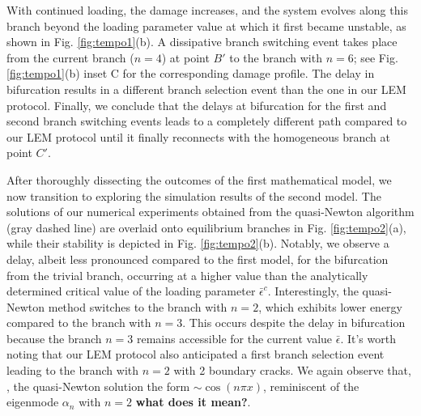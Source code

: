 With continued loading, the damage increases, and the system evolves along this branch beyond the loading parameter value at which it first became unstable, as shown in Fig. \ref{fig:tempo1}(b). A dissipative branch switching event takes place from the current branch (\(n=4\)) at point \(B'\) to the branch with \(n=6\); see Fig. \ref{fig:tempo1}(b) inset C for the corresponding damage profile. The delay in bifurcation results in a different branch selection event than the one in our LEM protocol. Finally, we conclude that the delays at bifurcation for the first and second branch switching events leads to a completely different path compared to our LEM protocol until it finally reconnects with the homogeneous branch at point \(C'\).

After thoroughly dissecting the outcomes of the first mathematical model, we now transition to exploring the simulation results of the second model. The solutions of our  numerical experiments obtained from the quasi-Newton algorithm (gray dashed line) are overlaid onto equilibrium branches in Fig. \ref{fig:tempo2}(a), while their stability  is depicted in Fig. \ref{fig:tempo2}(b). Notably, we observe a delay, albeit less pronounced compared to the first model, for the bifurcation from the trivial branch, occurring at a higher value than the analytically determined critical value of the loading parameter \(\bar{\epsilon}^c\). Interestingly, the quasi-Newton method switches to the branch with $n=2$, which exhibits lower energy compared to the branch with $n=3$. This occurs  despite the delay in bifurcation because the branch  $n=3$ remains accessible for the current value $\bar\epsilon$. It's worth noting that our LEM protocol also anticipated a first branch selection event leading to the branch with $n=2$ with 2 boundary cracks. 
We again observe that, , the quasi-Newton solution  the form \(\sim \cos(n\pi x)\), reminiscent of the eigenmode $\alpha_n$  with \(n=2\) \textbf{what does it mean?}. 
